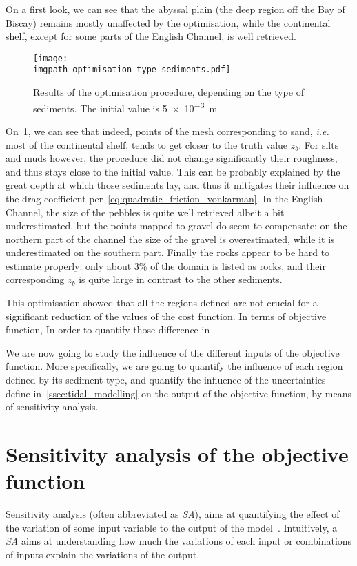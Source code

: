 \documentclass[../../Main_ManuscritThese.tex]{subfiles}
\newcommand{\zob}{z_b}
\newcommand\imgpath{/home/victor/acadwriting/Manuscrit/Text/Chapter5/img/}
\begin{document}
On a first look, we can see that the abyssal plain (the deep region
off the Bay of Biscay) remains mostly unaffected by the optimisation,
while the continental shelf, except for some parts of the English
Channel, is well retrieved.

\begin{figure}[ht]
  \centering
  \texttt{[image: \\imgpath optimisation\_type\_sediments.pdf]}
  \caption[Final values of the optimisation procedure, based on the sediment type]{\label{fig:optimisation_type_sediments} Results of the
    optimisation procedure, depending on the type of sediments. The
    initial value is \SI{5e-3}{\meter}}
\end{figure}

On~\cref{fig:optimisation_type_sediments}, we can see that indeed,
points of the mesh corresponding to sand, \emph{i.e.} most of the
continental shelf, tends to get closer to the truth value $\zob$.  For
silts and muds however, the procedure did not change significantly
their roughness, and thus stays close to the initial value. This can
be probably explained by the great depth at which those sediments lay,
and thus it mitigates their influence on the drag coefficient
per~\cref{eq:quadratic_friction_vonkarman}.  In the English Channel,
the size of the pebbles is quite well retrieved albeit a bit
underestimated, but the points mapped to gravel do seem to compensate:
on the northern part of the channel the size of the gravel is
overestimated, while it is underestimated on the southern part.
Finally the rocks appear to be hard to estimate properly: only about
3\% of the domain is listed as rocks, and their corresponding $\zob$
is quite large in contrast to the other sediments.

This optimisation showed that all the regions defined are not crucial
for a significant reduction of the values of the cost function. In
terms of objective function, In order to quantify those difference in

We are now going to study the influence of the different inputs of the
objective function. More specifically, we are going to quantify the
influence of each region defined by its sediment type, and quantify
the influence of the uncertainties define
in~\cref{ssec:tidal_modelling} on the output of the objective
function, by means of sensitivity analysis.


\section{Sensitivity analysis of the objective function}
\label{sec:sensitivity-analysis}
Sensitivity analysis (often abbreviated as \emph{SA}), aims at
quantifying the effect of the variation of some input variable to the
output of the model~\cite{iooss_revue_2011,janon_analyse_2012}.
Intuitively, a \emph{SA} aims at understanding how much the variations
of each input or combinations of inputs explain the variations of the
output.
\end{document}
